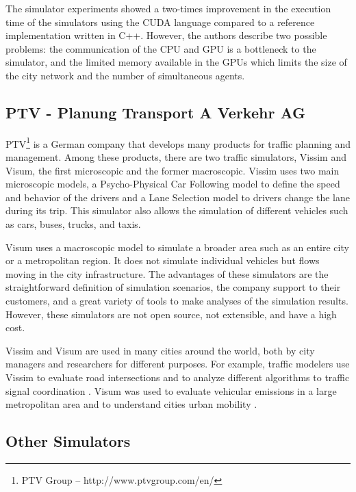 The simulator experiments showed a two-times improvement in the execution time of the simulators using the CUDA language compared to a reference implementation written in C++. However, the authors describe two possible problems: the communication of the CPU and GPU is a bottleneck to the simulator, and the limited memory available in the GPUs which limits the size of the city network and the number of simultaneous agents.

\subsection{PTV - Planung Transport A Verkehr AG}

PTV\footnote{PTV Group -- http://www.ptvgroup.com/en/} is a German company that develops many products for traffic planning and management. Among these products, there are two traffic simulators, Vissim and Visum, the first microscopic and the former macroscopic. Vissim uses two main microscopic models, a Psycho-Physical Car Following model to define the speed and behavior of the drivers and a Lane Selection model to drivers change the lane during its trip. This simulator also allows the simulation of different vehicles such as cars, buses, trucks, and taxis.

Visum uses a macroscopic model to simulate a broader area such as an entire city or a metropolitan region. It does not simulate individual vehicles but flows moving in the city infrastructure. The advantages of these simulators are the straightforward definition of simulation scenarios, the company support to their customers, and a great variety of tools to make analyses of the simulation results. However, these simulators are not open source, not extensible, and have a high cost.

Vissim and Visum are used in many cities around the world, both by city managers and researchers for different purposes. For example, traffic modelers use Vissim to evaluate road intersections \citep{kumar2017evaluation,du2018research} and to analyze different algorithms to traffic signal coordination \citep{bai2018traffic,yan2018study}. Visum was used to evaluate vehicular emissions in a large metropolitan area \citep{sider2014evaluating} and to understand cities urban mobility \citep{montero2018barcelona} .

\subsection{Other Simulators}

